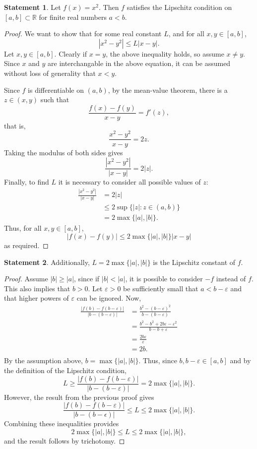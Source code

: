 \documentclass[12pt]{article}
\newcommand{\R}{\mathbb{R}} %
\newcommand{\modulus}[1]{\left|{#1}\right|} %
\newcommand{\ve}{\varepsilon} %
\begin{document}
\theoremstyle{definition}
\newtheorem{st}{Statement}

\begin{st}
Let $f(x)=x^2$. Then $f$ satisfies the Lipschitz condition on $[a,b]\subset\R$ for finite real numbers $a<b$.
\end{st}

\begin{proof}
We want to show that for some real constant $L$, and for all $x,y\in[a,b]$,
\[ \modulus{x^2-y^2}\leq L\modulus{x-y}. \]
Let $x,y\in[a,b]$. Clearly if $x=y$, the above inequality holds, so assume $x\neq y$. Since $x$ and $y$ are interchangable in the above equation, it can be assumed without loss of generality that $x<y$.

Since $f$ is differentiable on $(a,b)$, by the mean-value theorem, there is a $z\in(x,y)$ such that
  \[ \frac{f(x)-f(y)}{x-y}=f'(z), \]
that is,
  \[ \frac{x^2 - y^2}{x-y} = 2z. \]
Taking the modulus of both sides gives
  \[ \frac{\modulus{x^2-y^2}}{\modulus{x-y}} = 2\modulus{z}. \]
Finally, to find $L$ it is necessary to consider all possible values of $z$:
\begin{align*}
  \frac{\modulus{x^2-y^2}}{\modulus{x-y}} &=    2\modulus{z} \\ 
                                          &\leq 2\sup\{\modulus{z}\colon z\in (a,b) \} \\
                                          &=    2\max\{\modulus{a},\modulus{b}\}.
\end{align*}
Thus, for all $x,y\in[a,b]$,
\[ \modulus{f(x) - f(y)} \leq 2\max\{\modulus{a},\modulus{b}\}\modulus{x-y} \]
as required.
\end{proof}

\begin{st}
Additionally, $L=2\max\{\modulus{a},\modulus{b}\}$ is the Lipschitz constant of $f$.
\end{st}

\begin{proof}
Assume $\modulus{b}\geq\modulus{a}$, since if $\modulus{b}<\modulus{a}$, it is possible to consider $-f$ instead of $f$. This also implies that $b>0$. Let $\ve>0$ be sufficiently small that $a<b-\ve$ and that higher powers of $\ve$ can be ignored. Now,
\begin{align*}
  \frac{\modulus{f(b)-f(b-\ve)}}{\modulus{b-(b-\ve)}} &= \frac{b^2-(b-\ve)^2}{b-(b-\ve)} \\
    &= \frac{b^2-b^2+2b\ve-\ve^2}{b-b+\ve} \\
    &= \frac{2b\ve}{\ve} \\
    &= 2b. \\
\end{align*}
By the assumption above, $b=\max\{\modulus{a},\modulus{b}\}$. Thus, since $b,b-\ve\in[a,b]$ and by the definition of the Lipschitz condition,
\[ L\geq \frac{\modulus{f(b)-f(b-\ve)}}{\modulus{b-(b-\ve)}} = 2\max\{\modulus{a},\modulus{b}\}. \]
However, the result from the previous proof gives
\[ \frac{\modulus{f(b) - f(b-\ve)}}{\modulus{b-(b-\epsilon)}} \leq L \leq 2\max\{\modulus{a},\modulus{b}\}. \]
Combining these inequalities provides
\[ 2\max\{\modulus{a},\modulus{b}\}\leq L\leq 2\max\{\modulus{a},\modulus{b}\}, \]
and the result follows by trichotomy.
\end{proof}
\end{document}

